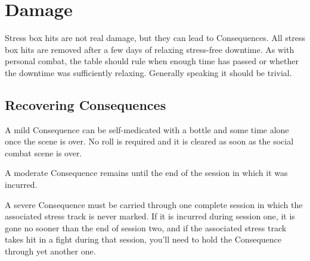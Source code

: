 \section{Damage}\label{sec:social-combat-damage}

Stress box hits are not real damage, but they can lead to Consequences. All stress box hits are removed after a few days of relaxing stress-free downtime. As with personal combat, the table should rule when enough time has passed or whether the downtime was sufficiently relaxing. Generally speaking it should be trivial.

\subsection{Recovering Consequences}\label{sec:social-combat-recovering-consequences}

A mild Consequence can be self-medicated with a bottle and some time alone once the scene is over. No roll is required and it is cleared as soon as the social combat scene is over.

A moderate Consequence remains until the end of the session in which it was incurred.

A severe Consequence must be carried through one complete session in which the associated stress track is never marked. If it is incurred during session one, it is gone no sooner than the end of session two, and if the associated stress track takes hit in a fight during that session, you'll need to hold the Consequence through yet another one.

